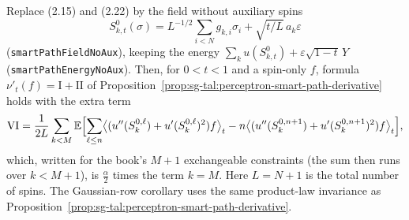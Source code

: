 \begin{lemma}\label{ex:sg-tal:perceptron-smart-path-without-auxiliary}
  \leanok
Replace (2.15) and (2.22) by the field without auxiliary spins
\[
 S^0_{k,t}(\sigma)=L^{-1/2}\sum_{i<N}g_{k,i}\sigma_i+\sqrt{t/L}\,a_k\varepsilon
\]
(\texttt{smartPathFieldNoAux}), keeping the energy $\sum_ku(S^0_{k,t})+\varepsilon\sqrt{1-t}\,Y$
(\texttt{smartPathEnergyNoAux}). Then, for $0<t<1$ and a spin-only $f$, formula $\nu'_t(f)=\mathrm I+\mathrm{II}$ of
Proposition~\ref{prop:sg-tal:perceptron-smart-path-derivative} holds with the extra term
\[
 \mathrm{VI}=\frac1{2L}\sum_{k<M}\mathbb E\Bigl[\sum_{\ell\le n}\bigl\langle(u''(S^{0,\ell}_k)+u'(S^{0,\ell}_k)^2)f\bigr\rangle_t
 -n\bigl\langle(u''(S^{0,n+1}_k)+u'(S^{0,n+1}_k)^2)f\bigr\rangle_t\Bigr],
\]
which, written for the book's $M+1$ exchangeable constraints (the sum then runs over $k<M+1$), is $\frac\alpha2$ times the term $k=M$.
Here $L=N+1$ is the total number of spins. The Gaussian-row corollary uses the same product-law
invariance as Proposition~\ref{prop:sg-tal:perceptron-smart-path-derivative}.
\end{lemma}
